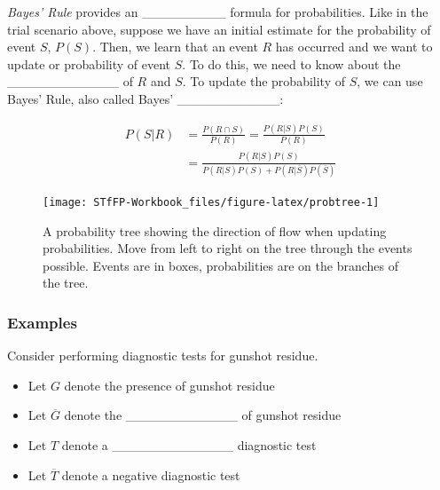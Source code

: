 \documentclass[]{book}
\providecommand{\tightlist}{%
  \setlength{\itemsep}{0pt}\setlength{\parskip}{0pt}}
\theoremstyle{definition}
\theoremstyle{definition}
\theoremstyle{remark}
\begin{document}
\emph{Bayes' Rule} provides an \_\_\_\_\_\_\_\_\_ formula for
probabilities. Like in the trial scenario above, suppose we have an
initial estimate for the probability of event \(S\), \(P(S)\). Then, we
learn that an event \(R\) has occurred and we want to update or
probability of event \(S\). To do this, we need to know about the
\_\_\_\_\_\_\_\_\_\_\_\_ of \(R\) and \(S\). To update the probability
of \(S\), we can use Bayes' Rule, also called Bayes'
\_\_\_\_\_\_\_\_\_\_\_:

\begin{equation}\label{eq:4}
\begin{split}
P(S|R) & = \frac{P(R \cap S)}{P(R)} = \frac{P(R|S)P(S)}{P(R)} \\
& = \frac{P(R|S)P(S)}{P(R|S)P(S) + P(R|\overline{S})P(\overline{S})} 
\end{split}
\end{equation}

\begin{figure}

{\centering \texttt{[image: STfFP-Workbook\_files/figure-latex/probtree-1]} 

}

\caption{A probability tree showing the direction of flow when updating probabilities. Move from left to right on the tree through the events possible. Events are in boxes, probabilities are on the branches of the tree.}\label{fig:probtree}
\end{figure}

\subsubsection{Examples}\label{examples-2}

Consider performing diagnostic tests for gunshot residue.

\begin{itemize}
\tightlist
\item
  Let \(G\) denote the presence of gunshot residue \vspace{.1in}
\item
  Let \(\overline{G}\) denote the \_\_\_\_\_\_\_\_\_\_\_\_ of gunshot
  residue \vspace{.1in}
\item
  Let \(T\) denote a \_\_\_\_\_\_\_\_\_\_\_\_\_ diagnostic test
  \vspace{.1in}
\item
  Let \(\overline{T}\) denote a negative diagnostic test
\end{itemize}
\end{document}
